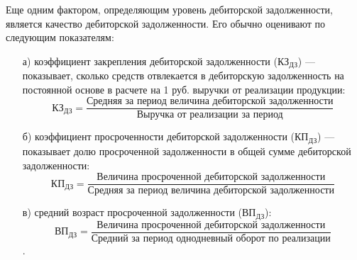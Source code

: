  Еще одним фактором, определяющим уровень дебиторской задолженности, является качество дебиторской задолженности.
 Его обычно оценивают по следующим показателям:
 \begin{enumerate}
 	\item [а)]коэффициент закрепления дебиторской задолженности ($ \text{КЗ}_\text{{ДЗ}} $) --- показывает, сколько средств отвлекается в дебиторскую задолженность на постоянной основе в расчете на 1 руб. выручки от реализации продукции:
 	\[ \text{КЗ}_\text{{ДЗ}} =  \dfrac{\text{Средняя за период величина дебиторской задолженности}}{\text{Выручка от реализации за период}}\]
 	\item [б)] коэффициент просроченности дебиторской задолженности ($ \text{КП}_\text{{ДЗ}} $) --- показывает долю просроченной задолженности в общей сумме дебиторской задолженности:
	 \[ \text{КП}_\text{{ДЗ}} =  \dfrac{\text{Величина просроченной дебиторской задолженности}}{\text{Средняя за период величина дебиторской задолженности}}\]
	 \item [в)] средний возраст просроченной задолженности ($ \text{ВП}_\text{{ДЗ}} $):
	  \[ \text{ВП}_\text{{ДЗ}} =  \dfrac{\text{Величина просроченной дебиторской задолженности}}{\text{Средний за период однодневный оборот по реализации}}\].
 \end{enumerate}
 
 
 
 
 
 
 
 
 
 
 
 
 
 
 
 